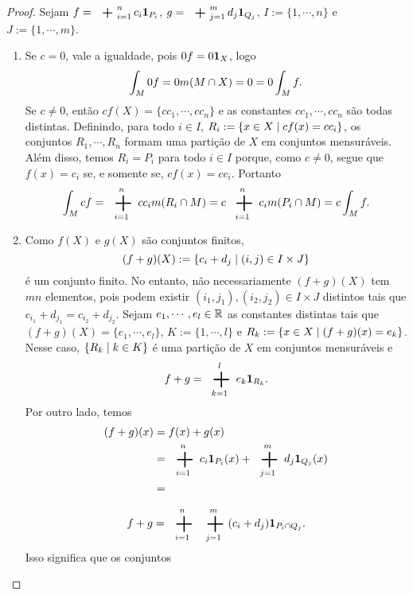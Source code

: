 \begin{proof}
Sejam $f=\sum_{i=1}^n c_i \idc_{P_i}$, $g=\sum_{j=1}^m d_j \idc_{Q_j}$, $I := \{1,\cdots,n\}$ e $J := \{1,\cdots,m\}$.
\begin{enumerate}
	\item Se $c=0$, vale a igualdade, pois $0f=0{\bm 1}_X$, logo
	\begin{equation*}
	\int_M 0f = 0m(M \cap X) = 0 = 0\int_M f.
	\end{equation*}
Se $c \neq 0$, então $cf(X)=\{cc_1,\cdots,cc_n\}$ e as constantes $cc_1,\cdots,cc_n$ são todas distintas. Definindo, para todo $i \in I$, $R_i := \left\{{x \in X}\;\middle\vert\;{cf(x)=cc_i}\right\}$, os conjuntos $R_1,\cdots,R_n$ formam uma partição de $X$ em conjuntos mensuráveis. Além disso, temos $R_i=P_i$ para todo $i \in I$ porque, como $c \neq 0$, segue que $f(x)=c_i$ se, e somente se, $cf(x)=cc_i$. Portanto
	\begin{equation*}
	\int_M cf = \sum_{i=1}^n cc_i \med(R_i \cap M) = c\bigplus_{i=1}^n c_i \med(P_i \cap M) = c\int_M f.
	\end{equation*}
	
	\item Como $f(X)$ e $g(X)$ são conjuntos finitos,
	\begin{equation*}
	(f+g)(X) := \left\{{c_i+d_j}\;\middle\vert\;{(i,j) \in I \times J}\right\}
	\end{equation*}
é um conjunto finito. No entanto, não necessariamente $(f+g)(X)$ tem $mn$ elementos, pois podem existir $(i_1,j_1),(i_2,j_2) \in I \times J$ distintos tais que $c_{i_1}+d_{j_1}=c_{i_2}+d_{j_2}$. Sejam $e_1,\cdots,e_l \in \mathbb{R}$ as constantes distintas tais que $(f+g)(X)=\{e_1,\cdots,e_l\}$, $K := \{1,\cdots,l\}$ e $R_k := \left\{{x \in X}\;\middle\vert\;{(f+g)(x)=e_k}\right\}$. Nesse caso, $\left\{{R_k}\;\middle\vert\;{k \in K}\right\}$ é uma partição de $X$ em conjuntos mensuráveis e
	\begin{equation*}
	f+g=\sum_{k=1}^l e_k \idc_{R_k}.
	\end{equation*}
Por outro lado, temos
	\begin{align*}
	(f+g)(x) &= f(x)+g(x) \\
				&= \sum_{i=1}^n c_i \idc_{P_i}(x) + \sum_{j=1}^m d_j \idc_{Q_j}(x) \\
				&= 
	\end{align*}
	

	\begin{equation*}
	f+g = \sum_{i=1}^n \sum_{j=1}^m (c_i+d_j) \idc_{P_i \cap Q_j}.
	\end{equation*}
 Isso significa que os conjuntos
\end{enumerate}
\end{proof}

